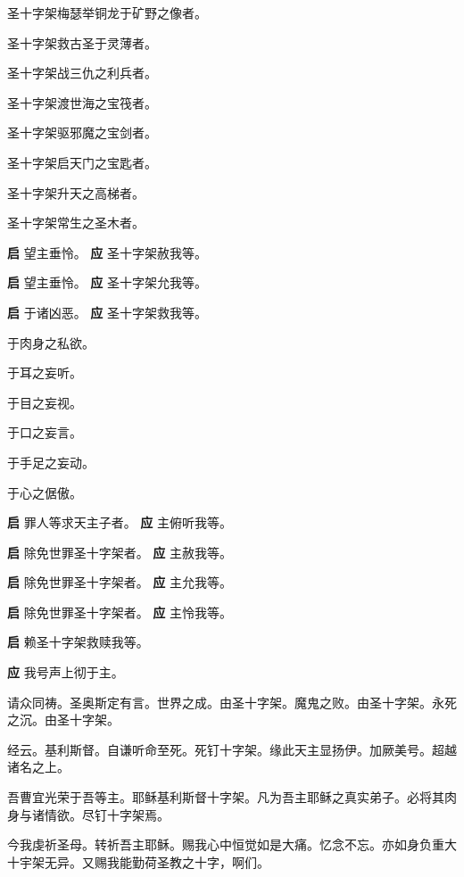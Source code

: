 \documentclass[UTF8,17pt]{ctexart}
\begin{document}
 圣⼗字架梅瑟举铜龙于矿野之像者。

 圣⼗字架救古圣于灵薄者。

 圣⼗字架战三仇之利兵者。

 圣⼗字架渡世海之宝筏者。

 圣⼗字架驱邪魔之宝剑者。

 圣⼗字架启天门之宝匙者。

 圣⼗字架升天之⾼梯者。

 圣⼗字架常⽣之圣⽊者。

\textbf{启} \quad 望主垂怜。 \hfill \textbf{应} \quad 圣⼗字架赦我等。

\textbf{启} \quad 望主垂怜。 \hfill \textbf{应} \quad 圣⼗字架允我等。

\textbf{启} \quad 于诸凶恶。 \hfill \textbf{应} \quad 圣⼗字架救我等。

 于⾁⾝之私欲。

 于⽿之妄听。

 于⽬之妄视。

 于口之妄⾔。

 于⼿⾜之妄动。

 于⼼之倨傲。

\textbf{启} \quad 罪⼈等求天主⼦者。 \hfill \textbf{应} \quad 主俯听我等。

\textbf{启} \quad 除免世罪圣⼗字架者。 \hfill \textbf{应} \quad 主赦我等。

\textbf{启} \quad 除免世罪圣⼗字架者。 \hfill \textbf{应} \quad 主允我等。

\textbf{启} \quad 除免世罪圣⼗字架者。 \hfill \textbf{应} \quad 主怜我等。

\textbf{启} \quad 赖圣⼗字架救赎我等。

\textbf{应} \quad 我号声上彻于主。

请众同祷。圣奥斯定有⾔。世界之成。由圣⼗字架。魔⿁之败。由圣⼗字架。永死之沉。由圣⼗字架。

经云。基利斯督。⾃谦听命⾄死。死钉⼗字架。缘此天主显扬伊。加厥美号。超越诸名之上。

吾曹宜光荣于吾等主。耶稣基利斯督⼗字架。凡为吾主耶稣之真实弟⼦。必将其⾁⾝与诸情欲。尽钉⼗字架焉。

今我虔祈圣母。转祈吾主耶稣。赐我⼼中恒觉如是⼤痛。忆念不忘。亦如⾝负重⼤⼗宇架⽆异。又赐我能勤荷圣教之⼗字，啊们。
\end{document}
